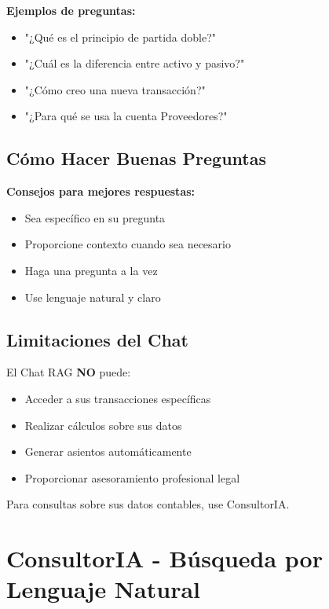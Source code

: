 \textbf{Ejemplos de preguntas:}
\begin{itemize}
    \item "¿Qué es el principio de partida doble?"
    \item "¿Cuál es la diferencia entre activo y pasivo?"
    \item "¿Cómo creo una nueva transacción?"
    \item "¿Para qué se usa la cuenta Proveedores?"
\end{itemize}

\subsection{Cómo Hacer Buenas Preguntas}

\begin{tipbox}
\textbf{Consejos para mejores respuestas:}
\begin{itemize}
    \item Sea específico en su pregunta
    \item Proporcione contexto cuando sea necesario
    \item Haga una pregunta a la vez
    \item Use lenguaje natural y claro
\end{itemize}
\end{tipbox}

\subsection{Limitaciones del Chat}

\begin{warningbox}
El Chat RAG \textbf{NO} puede:
\begin{itemize}
    \item Acceder a sus transacciones específicas
    \item Realizar cálculos sobre sus datos
    \item Generar asientos automáticamente
    \item Proporcionar asesoramiento profesional legal
\end{itemize}
\end{warningbox}

Para consultas sobre sus datos contables, use ConsultorIA.

\section{ConsultorIA - Búsqueda por Lenguaje Natural}

